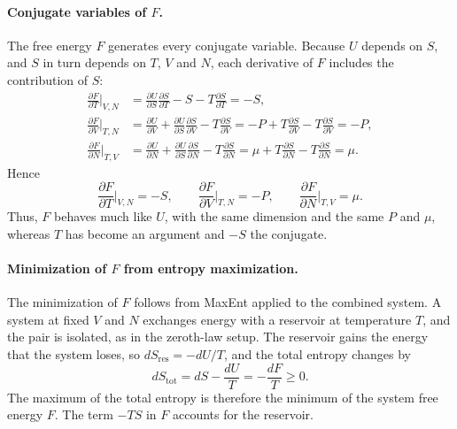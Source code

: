 \paragraph{Conjugate variables of $F$.}
The free energy $F$ generates every conjugate variable. Because $U$ depends
on $S$, and $S$ in turn depends on $T$, $V$ and $N$, each derivative of $F$
includes the contribution of $S$:
\begin{align*}
    \frac{\partial F}{\partial T}\bigg|_{V,N}
    &=\frac{\partial U}{\partial S}\frac{\partial S}{\partial T}-S
    -T\frac{\partial S}{\partial T}=-S,\\
    \frac{\partial F}{\partial V}\bigg|_{T,N}
    &=\frac{\partial U}{\partial V}+\frac{\partial U}{\partial S}\frac{\partial S}{\partial V}
    -T\frac{\partial S}{\partial V}
    =-P+T\frac{\partial S}{\partial V}-T\frac{\partial S}{\partial V}=-P,\\
    \frac{\partial F}{\partial N}\bigg|_{T,V}
    &=\frac{\partial U}{\partial N}+\frac{\partial U}{\partial S}\frac{\partial S}{\partial N}
    -T\frac{\partial S}{\partial N}
    =\mu+T\frac{\partial S}{\partial N}-T\frac{\partial S}{\partial N}=\mu.
\end{align*}
Hence
\begin{equation}
    \boxed{\frac{\partial F}{\partial T}\bigg|_{V,N}=-S,\qquad
    \frac{\partial F}{\partial V}\bigg|_{T,N}=-P,\qquad
    \frac{\partial F}{\partial N}\bigg|_{T,V}=\mu.}
\end{equation}
Thus, $F$ behaves much like $U$, with the same dimension and the same $P$
and $\mu$, whereas $T$ has become an argument and $-S$ the conjugate.

\paragraph{Minimization of $F$ from entropy maximization.}
The minimization of $F$ follows from MaxEnt applied to the combined system.
A system at fixed $V$ and $N$ exchanges energy with a reservoir at
temperature $T$, and the pair is isolated, as in the zeroth-law setup. The
reservoir gains the energy that the system loses, so
$dS_{\text{res}}=-dU/T$, and the total entropy changes by
\begin{equation}
    \boxed{dS_{\text{tot}}=dS-\frac{dU}{T}=-\frac{dF}{T}\geq0.}
\end{equation}
The maximum of the total entropy is therefore the minimum of the system free
energy $F$. The term $-TS$ in $F$ accounts for the reservoir.

